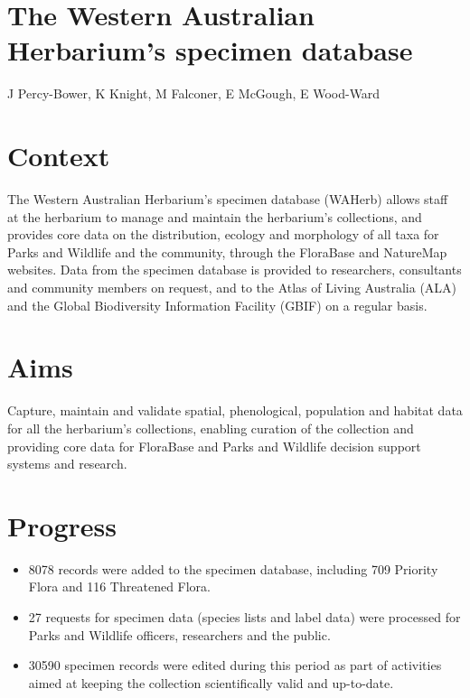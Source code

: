 \documentclass[version=last,
    paper=a4, %
    10pt, %
    usenames,
    dvipsnames,
    oneside, %
    headings=openany, %
    DIV=15 %
]{scrbook}
\begin{document}
\section*{The Western Australian Herbarium's specimen database
}

J Percy-Bower, K Knight, M Falconer, E McGough, E Wood-Ward



\section*{Context}

The Western Australian Herbarium's specimen database (WAHerb) allows
staff at the herbarium to manage and maintain the herbarium's
collections, and provides core data on the distribution, ecology and
morphology of all taxa for Parks and Wildlife and the community, through
the FloraBase and NatureMap websites. Data from the specimen database is
provided to researchers, consultants and community members on request,
and to the Atlas of Living Australia (ALA) and the Global Biodiversity
Information Facility (GBIF) on a regular basis.




\section*{Aims}

Capture, maintain and validate spatial, phenological, population and
habitat data for all the herbarium's collections, enabling curation of
the collection and providing core data for FloraBase and Parks and
Wildlife decision support systems and research.




\section*{Progress}

\begin{itemize}
\itemsep1pt\parskip0pt
\item
  8078 records were added to the specimen database, including 709
  Priority Flora and 116 Threatened Flora.
\item
  27 requests for specimen data (species lists and label data) were
  processed for Parks and Wildlife officers, researchers and the public.
\item
  30590 specimen records were edited during this period as part of
  activities aimed at keeping the collection scientifically valid and
  up-to-date.
\end{itemize}
\end{document}
